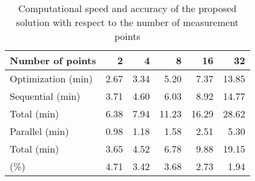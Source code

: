\begin{table*}
  \centering
  \caption{
    Computational speed and accuracy of the proposed solution with respect to
    the number of measurement points
  }
  \ttfamily
  \begin{tabular}{lrrrrr}
    \toprule
    \textnormal{Number of points}   &    2 &    4 &     8 &    16 &    32 \\
    \midrule
    \textnormal{Optimization (min)} & 2.67 & 3.34 &  5.20 &  7.37 & 13.85 \\
    \midrule
    \textnormal{Sequential (min)}   & 3.71 & 4.60 &  6.03 &  8.92 & 14.77 \\
    \textnormal{Total (min)}        & 6.38 & 7.94 & 11.23 & 16.29 & 28.62 \\
    \midrule
    \textnormal{Parallel (min)}     & 0.98 & 1.18 &  1.58 &  2.51 &  5.30 \\
    \textnormal{Total (min)}        & 3.65 & 4.52 &  6.78 &  9.88 & 19.15 \\
    \midrule
    \textnormal{\up{NRMSE} (\%)}    & 4.71 & 3.42 &  3.68 &  2.73 &  1.94 \\
    \bottomrule
  \end{tabular}
\end{table*}
